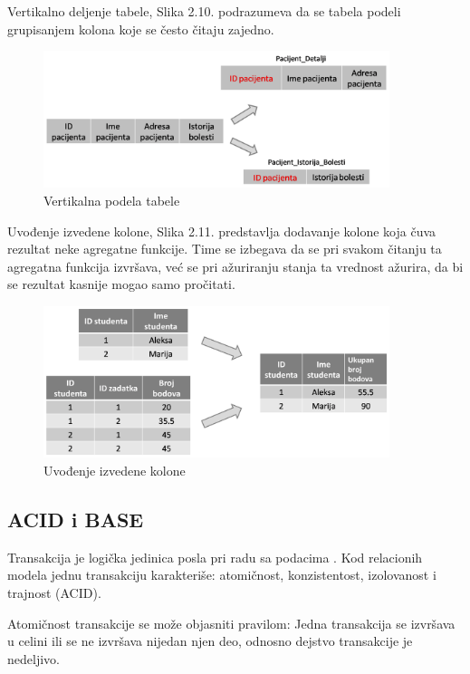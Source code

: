 \documentclass[12pt,oneside]{memoir}
\begin{document}
Vertikalno deljenje tabele, Slika 2.10. podrazumeva da se tabela podeli grupisanjem kolona koje se često čitaju zajedno. 

\begin{figure}[!ht]
  \centering
  \includegraphics[width=0.9\textwidth]{denormalizacija3.png}
  \caption{Vertikalna podela tabele}
  \label{fig:grafikon}
\end{figure}

Uvođenje izvedene kolone, Slika 2.11. predstavlja dodavanje kolone koja čuva rezultat neke agregatne funkcije. Time se izbegava da se pri svakom čitanju ta agregatna funkcija izvršava, već se pri ažuriranju stanja ta vrednost ažurira, da bi se rezultat kasnije mogao samo pročitati.


\begin{figure}[!ht]
  \centering
  \includegraphics[width=0.9\textwidth]{denormalizacija4.png}
  \caption{Uvođenje izvedene kolone}
  \label{fig:grafikon}
\end{figure}
\pagebreak

\subsection{ACID i BASE}

Transakcija je logička jedinica posla pri radu sa podacima \cite{URBP}. Kod relacionih modela jednu transakciju karakteriše: atomičnost, konzistentost, izolovanost i trajnost (ACID).

Atomičnost transakcije se može objasniti pravilom: Jedna transakcija se izvršava u celini ili se ne izvršava nijedan njen deo, odnosno dejstvo transakcije je nedeljivo. 
\end{document}
